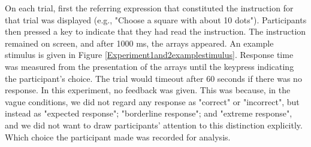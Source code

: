 On each trial, first the referring expression that constituted the instruction for that trial was displayed (e.g., "Choose a square with about 10 dots"). Participants then pressed a key to indicate that they had read the instruction. The instruction remained on screen, and after 1000 ms, the arrays appeared. An example stimulus is given in Figure \ref{Experiment1and2examplestimulus}. Response time was measured from the presentation of the arrays until the keypress indicating the participant's choice. The trial would timeout after 60 seconds if there was no response. 
%
In this experiment, no feedback was given. This was because, in the vague conditions, we did not regard any response as "correct" or "incorrect", but instead as "expected response"; "borderline response"; and "extreme response", and we did not want to draw participants' attention to this distinction explicitly. Which choice the participant made was recorded for analysis.


